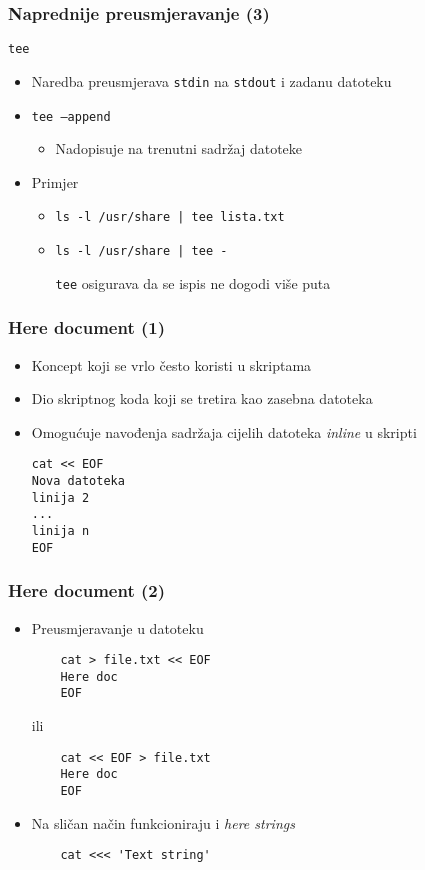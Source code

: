 \documentclass{beamer}
\newcommand{\shell}[1]{\texttt{#1}}
\begin{document}
\begin{frame}[t]
\frametitle{Naprednije preusmjeravanje (3)}
\shell{tee}
\begin{itemize}
	\item Naredba preusmjerava \shell{stdin} na \shell{stdout} i zadanu datoteku
	\item \shell{tee --append}
	\begin{itemize}
		\item Nadopisuje na trenutni sadržaj datoteke
	\end{itemize}
\end{itemize}
\begin{itemize}
	\item Primjer
	\begin{itemize}
		\item \shell{ls -l /usr/share | tee lista.txt}
		\item \shell{ls -l /usr/share | tee -}
		\item[] {\footnotesize \shell{tee} osigurava da se ispis ne dogodi više puta}
	\end{itemize}
\end{itemize}
\end{frame}

\begin{frame}[fragile]
\frametitle{Here document (1)}
\begin{itemize}
	\item Koncept koji se vrlo često koristi u skriptama
	\item Dio skriptnog koda koji se tretira kao zasebna datoteka
	\item Omogućuje navođenja sadržaja cijelih datoteka \textit{inline} u skripti
\end{itemize}
\begin{itemize}
\item[] \begin{verbatim}
cat << EOF
Nova datoteka
linija 2
...
linija n
EOF
\end{verbatim}
\end{itemize}
\end{frame}

\begin{frame}[fragile]
\frametitle{Here document (2)}
\begin{itemize}
	\item Preusmjeravanje u datoteku
	\item[] \begin{verbatim}
	cat > file.txt << EOF
	Here doc
	EOF
	\end{verbatim}
	\item[ili] \begin{verbatim}
	cat << EOF > file.txt
	Here doc
	EOF
	\end{verbatim}
\end{itemize}
\begin{itemize}
	\item Na sličan način funkcioniraju i \textit{here strings}
	\item[] \begin{verbatim}
	cat <<< 'Text string'
	\end{verbatim}
\end{itemize}
\end{frame}
\end{document}
